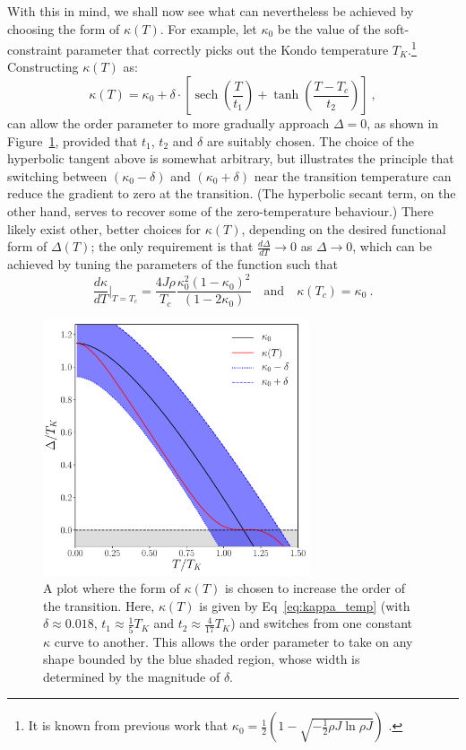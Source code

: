 \documentclass[12pt]{article}
\DeclareMathOperator{\sech}{sech}
\begin{document}
With this in mind, we shall now see what can nevertheless be achieved by choosing the form of $ \kappa (T) $. For example, let $ \kappa_0 $ be the value of the soft-constraint parameter that correctly picks out the Kondo temperature $ T_K $.\footnote{It is known from previous work that $ \kappa_0 = \frac{1}{2} \left( 1 - \sqrt{- \frac{1}{2} \rho J \ln{\rho J}} \right) $ \cite{Draft}.} Constructing $ \kappa(T) $ as:
\begin{equation}
\kappa(T) = \kappa_0 + \delta \cdot \left[ \sech{\left( \frac{T}{t_1} \right)} + \tanh{\left( \frac{T - T_c}{t_2} \right)} \right] ~,
\end{equation}
can allow the order parameter to more gradually approach $ \Delta = 0$, as shown in Figure~\ref{fig:delta_smooth}, provided that $ t_1 $, $ t_2 $ and $ \delta $ are suitably chosen. The choice of the hyperbolic tangent above is somewhat arbitrary, but illustrates the principle that switching between $ (\kappa_0 - \delta) $ and $ (\kappa_0 + \delta) $ near the transition temperature can reduce the gradient to zero at the transition. (The hyperbolic secant term, on the other hand, serves to recover some of the zero-temperature behaviour.) There likely exist other, better choices for $ \kappa(T) $, depending on the desired functional form of $ \Delta(T) $; the only requirement is that $ \frac{d \Delta}{d T} \rightarrow 0 $ as $ \Delta \rightarrow 0 $, which can be achieved by tuning the parameters of the function such that 
\begin{equation}
\frac{d \kappa}{d T} \Bigr|_{T = T_c} = \frac{4 J \rho}{T_c} \frac{\kappa^2_0 (1 - \kappa_0)^2}{(1 - 2 \kappa_0)} \quad \text{and} \quad \kappa(T_c) = \kappa_0 ~ .
\end{equation}

\begin{figure}
\centering
\includegraphics[width=0.7\textwidth]{Figures/range_delta_vs_T.pdf}
\caption{A plot where the form of $ \kappa(T) $ is chosen to increase the order of the transition. Here, $ \kappa(T) $ is given by Eq~\eqref{eq:kappa_temp} (with $ \delta \approx 0.018 $, $ t_1 \approx \frac{1}{5} T_K $ and $ t_2 \approx \frac{4}{17} T_K $) and switches from one constant $ \kappa $ curve to another. This allows the order parameter to take on any shape bounded by the blue shaded region, whose width is determined by the magnitude of $ \delta $.}
\label{fig:delta_smooth}
\end{figure}
\end{document}
